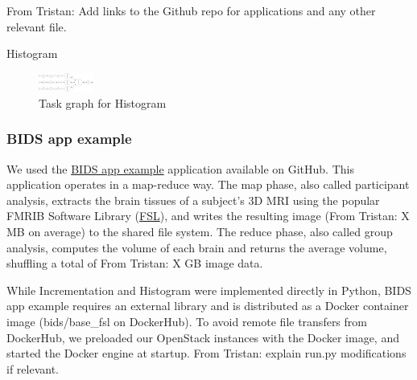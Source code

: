 \documentclass[conference]{IEEEtran}
\newcommand{\TG}[1]{\color{cyan}From Tristan: #1 \color{black}}
\begin{document}
 \TG{Add links to the Github repo for applications and any other relevant file.}

\begin{algorithm}[!t]
    \caption{Histogram}\label{alg:histogram}
    \begin{algorithmic}
    \EndFor
    

    \end{algorithmic}
\end{algorithm}

\begin{figure}[!t]
    \centering
    \includegraphics[width=0.16\textwidth, angle=-90]{images/histogram-task-graph.png}
    \caption{Task graph for Histogram}\label{fig:tg-histo}
\end{figure}

\subsubsection{BIDS app example}

We used the \href{https://github.com/BIDS-Apps/example}{BIDS app example}
application available on GitHub. This application operates in a map-reduce
way. The map phase, also called participant analysis, extracts the brain
tissues of a subject's 3D MRI using the popular FMRIB Software Library
(\href{https://fsl.fmrib.ox.ac.uk/fsl/fslwiki}{FSL}), and writes the
resulting image (\TG{X}MB on average) to the shared file system. The reduce
phase, also called group analysis, computes the volume of each brain and
returns the average volume, shuffling a total of \TG{X}GB image data.

While Incrementation and Histogram were implemented directly in Python,
BIDS app example requires an external library and is distributed as a
Docker container image (bids/base\_fsl on DockerHub). To avoid remote file
transfers from DockerHub, we preloaded our OpenStack instances with the
Docker image, and started the Docker engine at startup. \TG{explain run.py modifications if relevant.}
\end{document}
